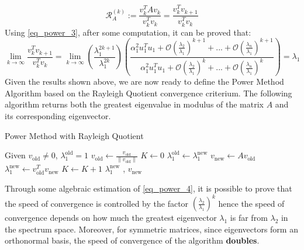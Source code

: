 \begin{equation}
    \mathcal{R}_A^{(k)} := \frac{v_k^T A v_k}{v_k^T v_k} = \frac{v_k^T  v_{k+1}}{v_k^T v_k} 
\end{equation}
Using \ref{eq_power_3}, after some computation, it can be proved that:
\begin{equation} \label{eq_power_4}
    \lim_{k \to \infty} \frac{v_k^T  v_{k+1}}{v_k^T v_k} = \lim_{k \to \infty} \left(\frac{\lambda_1^{2k+1}}{\lambda_1^{2k}}\right) \left(\frac{\alpha_1^2 u_1^T u_1 + \mathcal{O}\left(\frac{\lambda_2}{\lambda_1}\right)^{k+1}+ ... + \mathcal{O}\left(\frac{\lambda_n}{\lambda_1}\right)^{k+1}}{\alpha_1^2 u_1^T u_1 + \mathcal{O}\left(\frac{\lambda_2}{\lambda_1}\right)^{k}+ ... + \mathcal{O}\left(\frac{\lambda_n}{\lambda_1}\right)^{k}}\right) = \lambda_1
\end{equation}
Given the results shown above, we are now ready to define the Power Method Algorithm based on the Rayleigh Quotient convergence criterium. The following algorithm returns both the greatest eigenvalue in modulus of the matrix \(A\) and its corresponding eigenvector.
\begin{algorithm}\caption{Power Method with Rayleigh Quotient}
    \label{algo:power_method}
    \begin{algorithmic}
     \State Given \(v_{\text{old}} \neq 0\), \(\lambda_1^{\text{old}} = 1\) 
     \State \(v_{\text{old}} \gets \frac{v_{\text{old}}}{\| v_{\text{old}}\|}\)
     \State \(K \gets 0\)
     \State \(\lambda_1^{\text{old}} \gets \lambda_1^{\text{new}}\)
     \State \(v_{\text{new}} \gets  A v_{\text{old}}\)
     \State \(\lambda_1^{\text{new}} \gets  v_{\text{old}}^T v_{\text{new}}\)
     \State \(K \gets K+ 1\)
     \EndWhile
     \State
     \Return \(\lambda_1^{\text{new}}\) , \(v_{\text{new}}\)
    \end{algorithmic}            
  \end{algorithm}
  \begin{mdframed}
    Through some algebraic estimation of \ref{eq_power_4}, it is possible to prove that the speed of convergence is controlled by the factor \(\left(\frac{\lambda_2}{\lambda_1}\right)^k\) hence the speed of convergence depends on how much the greatest eigenvector \(\lambda_1\) is far from \(\lambda_2\) in the spectrum space. Moreover, for symmetric matrices, since eigenvectors form an orthonormal basis, the speed of convergence of the algorithm \textbf{doubles}.
  \end{mdframed}

